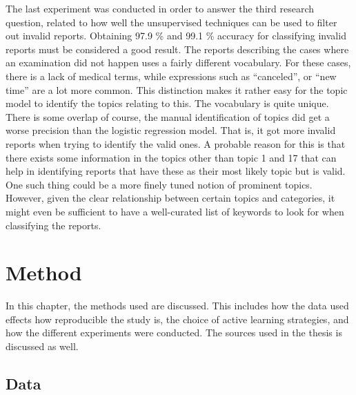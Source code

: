 The last experiment was conducted in order to answer the third research question, related to how well the unsupervised techniques can be used to filter out invalid reports.
Obtaining 97.9 \% and 99.1 \% accuracy for classifying invalid reports must be considered a good result.
The reports describing the cases where an examination did not happen uses a fairly different vocabulary.
For these cases, there is a lack of medical terms, while expressions such as ``canceled'', or ``new time'' are a lot more common.
This distinction makes it rather easy for the topic model to identify the topics relating to this.
The vocabulary is quite unique.
There is some overlap of course, the manual identification of topics did get a worse precision than the logistic regression model.
That is, it got more invalid reports when trying to identify the valid ones.
A probable reason for this is that there exists some information in the topics other than topic 1 and 17 that can help in identifying reports that have these as their most likely topic but is valid.
One such thing could be a more finely tuned notion of prominent topics.
However, given the clear relationship between certain topics and categories, it might even be sufficient to have a well-curated list of keywords to look for when classifying the reports.



\section{Method}
\label{sec:discussion-method}

In this chapter, the methods used are discussed.
This includes how the data used effects how reproducible the study is, the choice of active learning strategies,  and how the different experiments were conducted.
The sources used in the thesis is discussed as well.

\subsection{Data}

